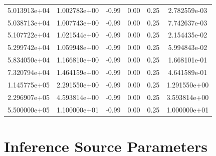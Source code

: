 \documentclass{article}
\begin{document}
\begin{table}[htbp]
\begin{tabular}{cccccc}
5.013913e+04 & 1.002783e+00 & -0.99 & 0.00 & 0.25 & 2.782559e-03 \\
5.038713e+04 & 1.007743e+00 & -0.99 & 0.00 & 0.25 & 7.742637e-03 \\
5.107722e+04 & 1.021544e+00 & -0.99 & 0.00 & 0.25 & 2.154435e-02 \\
5.299742e+04 & 1.059948e+00 & -0.99 & 0.00 & 0.25 & 5.994843e-02 \\
5.834050e+04 & 1.166810e+00 & -0.99 & 0.00 & 0.25 & 1.668101e-01 \\
7.320794e+04 & 1.464159e+00 & -0.99 & 0.00 & 0.25 & 4.641589e-01 \\
1.145775e+05 & 2.291550e+00 & -0.99 & 0.00 & 0.25 & 1.291550e+00 \\
2.296907e+05 & 4.593814e+00 & -0.99 & 0.00 & 0.25 & 3.593814e+00 \\
5.500000e+05 & 1.100000e+01 & -0.99 & 0.00 & 0.25 & 1.000000e+01 \\
\hline
\end{tabular}
\end{table}

\clearpage

\section*{Inference Source Parameters}
\end{document}
